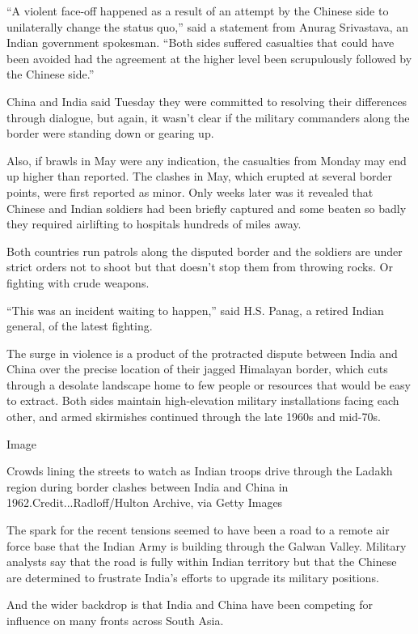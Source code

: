 ``A violent face-off happened as a result of an attempt by the Chinese
side to unilaterally change the status quo,'' said a statement from
Anurag Srivastava, an Indian government spokesman. ``Both sides suffered
casualties that could have been avoided had the agreement at the higher
level been scrupulously followed by the Chinese side.''

China and India said Tuesday they were committed to resolving their
differences through dialogue, but again, it wasn't clear if the military
commanders along the border were standing down or gearing up.

Also, if brawls in May were any indication, the casualties from Monday
may end up higher than reported. The clashes in May, which erupted at
several border points, were first reported as minor. Only weeks later
was it revealed that Chinese and Indian soldiers had been briefly
captured and some beaten so badly they required airlifting to hospitals
hundreds of miles away.

Both countries run patrols along the disputed border and the soldiers
are under strict orders not to shoot but that doesn't stop them from
throwing rocks. Or fighting with crude weapons.

``This was an incident waiting to happen,'' said H.S. Panag, a retired
Indian general, of the latest fighting.

The surge in violence is a product of the protracted dispute between
India and China over the precise location of their jagged Himalayan
border, which cuts through a desolate landscape home to few people or
resources that would be easy to extract. Both sides maintain
high-elevation military installations facing each other, and armed
skirmishes continued through the late 1960s and mid-70s.

Image

Crowds lining the streets to watch as Indian troops drive through the
Ladakh region during border clashes between India and China in
1962.Credit...Radloff/Hulton Archive, via Getty Images

The spark for the recent tensions seemed to have been a road to a remote
air force base that the Indian Army is building through the Galwan
Valley. Military analysts say that the road is fully within Indian
territory but that the Chinese are determined to frustrate India's
efforts to upgrade its military positions.

And the wider backdrop is that India and China have been competing for
influence on many fronts across South Asia.

